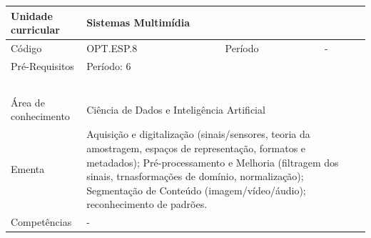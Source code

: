 \clearpage
\newpage

\begin{quadro}[ht!]
  \centering\scriptsize
\caption{Unidade Curricular Sistemas Multimídia}

\begin{tabular}{|p{2.5cm}|p{2.5cm}|p{2.5cm}|p{2.5cm}|p{2.5cm}|}\hline

  Unidade curricular & \multicolumn{4}{p{10cm}|}{ Sistemas Multimídia }\\\hline
  Código & OPT.ESP.8 & Período & \multicolumn{2}{p{5cm}|}{ - }\\\hline
  Pré-Requisitos & \multicolumn{4}{p{10cm}|}{ Período: 6 } \\\hline
  \cellcolor{blue1}{ CH PRESENCIAL } &
    \cellcolor{blue1}{CH EAD Síncrona} &
    \cellcolor{blue1}{CH EAD Síncrona Mediada} &
    \cellcolor{blue1}{CH EAD Assíncrona} &
    \cellcolor{blue1}{CH APCC} \\\hline
  \cellcolor{blue1}{ 60 } &
    \cellcolor{blue1}{ 0 } &
    \cellcolor{blue1}{ 30 } &
    \cellcolor{blue1}{ 30 } &
    \cellcolor{blue1}{0} \\\hline
  \cellcolor{blue1}{ CH Teórica } &
    \cellcolor{blue1}{CH Prática} &
    \cellcolor{blue1}{CH Humanidades} &
    \cellcolor{blue1}{CH Extensão} &
    \cellcolor{blue1}{CH EAD TOTAL} \\\hline
  \cellcolor{blue1}{ 30 } &
    \cellcolor{blue1}{ 30 } &
    \cellcolor{blue1}{ 0 } &
    \cellcolor{blue1}{ 0 } &
    \cellcolor{blue1}{ 60 } \\\hline
  \cellcolor{blue1}{CARGA-HORÁRIA TOTAL} & \multicolumn{4}{p{10cm}|}{ \cellcolor{blue1}{ 60 } } \\\hline
  Área de conhecimento & \multicolumn{4}{p{10cm}|}{ Ciência de Dados e Inteligência Artificial } \\\hline
  Ementa & \multicolumn{4}{p{10cm}|}{ Aquisição e digitalização (sinais/sensores, teoria da amostragem, espaços de representação, formatos e metadados); Pré-processamento e Melhoria (filtragem dos sinais, trnasformações de domínio, normalização); Segmentação de Conteúdo (imagem/vídeo/áudio); reconhecimento de padrões. } \\\hline
  Competências & \multicolumn{4}{p{10cm}|}{ - } \\\hline


  
	\end{tabular}

\end{quadro}


